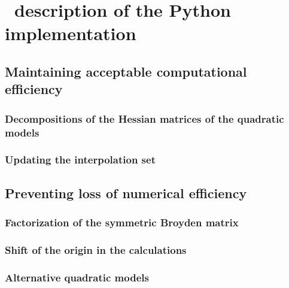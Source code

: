 %
%
%
\chapter{ \textemdash\ description of the Python implementation}

\section{Maintaining acceptable computational efficiency}

\subsection{Decompositions of the Hessian matrices of the quadratic models}

\subsection{Updating the interpolation set}

\section{Preventing loss of numerical efficiency}

\subsection{Factorization of the symmetric Broyden matrix}

\subsection{Shift of the origin in the calculations}

\subsection{Alternative quadratic models}
